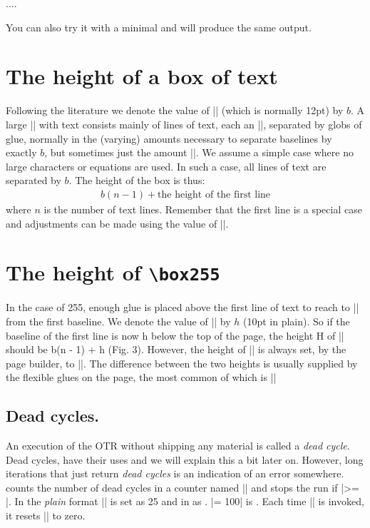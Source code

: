 \begin{teXXX}
....
\showthe\pagedepth
\bye
\end{teXXX}

You can also try it with a \latex minimal and will produce the same output.


\section{The height of a box of text}

Following the literature we denote the value of |\baselineskip| (which is normally 12pt) by $b$. 
A
large |\vbox| with text consists mainly of lines of
text, each an |\hbox|, separated by globs of glue,
normally in the (varying) amounts necessary to
separate baselines by exactly $b$, but sometimes just
the amount |\lineskip|. We assume a simple case
where no large characters or equations are used. In
such a case, all lines of text are separated by $b$. The
height of the box is thus:
\begin{gather}
b(n - 1) + \text{the height of the first line}
\end{gather}
where $n$ is the number of text lines. Remember that the first line is a special case and adjustments can be made using the value of |\topskip|.

\section{The height of \texttt{\textbackslash box255}}

In the case of 255,
enough glue is placed above the first line of text
to reach to |\topskip| from the first baseline. We
denote the value of |\topskip| by $h$ (10pt in plain).
So if the baseline of the first line is now h below the
top of the page, the height H of || should
be b(n - 1) + h (Fig. 3). However, the height of
|| is always set, by the page builder, to
|\vsize|. The difference between the two heights is
usually supplied by the flexible glues on the page,
the most common of which is |\parskip|

\begin{comment}
\begin{figure}[htp]
\texttt{[image: ./graphics/heightofpagebox.jpg]}
\end{figure}
\end{comment}

\subsection{Dead cycles.} An execution of the OTR without shipping any material is called a \emph{dead cycle}. Dead cycles, have their uses and we will explain this a bit later on. However, long iterations that just return \textit{dead cycles} is an indication of an error somewhere. \tex counts the number of dead cycles in a counter named |\deadcycles| and stops the run if |\deadcycles >= \maxdeadcycles|.  In the \textit{plain} format |\maxdeadcycles| is set as 25 and in \latex as \the\deadcycles. |\maxdeadcycles = 100| is \the\maxdeadcycles. Each time |\shipout| is invoked, it resets |\deadcycles| to zero.


